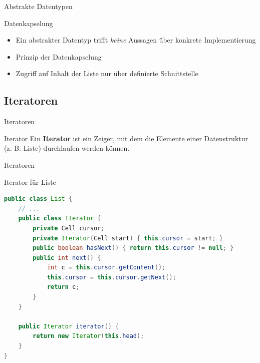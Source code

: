 \documentclass[18pt]{beamer}
\begin{document}
\begin{frame}{Abstrakte Datentypen}
    \begin{alertblock}{Datenkapselung}
        \begin{itemize}
            \item Ein abstrakter Datentyp trifft \textit{keine} Aussagen über konkrete Implementierung
            \item Prinzip der Datenkapselung
            \item Zugriff auf Inhalt der Liste nur über definierte Schnittstelle
        \end{itemize}
    \end{alertblock}

\end{frame}

\subsection{Iteratoren}


\begin{frame}{Iteratoren}
    \begin{block}{Iterator}
        Ein \textbf{Iterator} ist ein Zeiger, mit dem die Elemente einer Datenstruktur (z. B. Liste) durchlaufen werden können.
    \end{block}

\end{frame}

\begin{frame}[fragile]{Iteratoren}

    \begin{exampleblock}{Iterator für Liste}
        \begin{lstlisting}[language=Java,basicstyle=\scriptsize]
public class List {
    // ...
    public class Iterator {
        private Cell cursor;
        private Iterator(Cell start) { this.cursor = start; }
        public boolean hasNext() { return this.cursor != null; }
        public int next() {
            int c = this.cursor.getContent();
            this.cursor = this.cursor.getNext();
            return c;
        }
    }

    public Iterator iterator() {
        return new Iterator(this.head);
    }
}
        \end{lstlisting}

    \end{exampleblock}


\end{frame}
\end{document}
